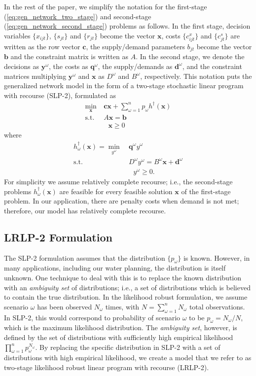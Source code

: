 \documentclass[12pt]{amsart}
\newcommand{\x}{\mathbf{x}}
\newcommand{\y}{\mathbf{y}}
\renewcommand{\c}{\mathbf{c}}
\newcommand{\q}{\mathbf{q}}
\renewcommand{\b}{\mathbf{b}}
\renewcommand{\d}{\mathbf{d}}
\newcommand{\st}{\mbox{s.t.}}
\begin{document}
In the rest of the paper, we simplify the notation for the first-stage (\ref{eq:gen_network_two_stage}) and second-stage (\ref{eq:gen_network_second_stage}) problems as follows.
In the first stage, decision variables $\{x_{ijt}\}$, $\{s_{jt}\}$ and $\{r_{jt}\}$ become the vector $\x$, costs $\{c_{ijt}^x\}$ and $\{c_{jt}^s\}$ are written as the row vector $\c$, the supply/demand parameters $b_{jt}$ become the vector $\b$ and the constraint matrix is written as $A$.
In the second stage, we denote the decisions as $\y^\omega$, the costs as $\q^\omega$, the supply/demands as $\d^\omega$, and the constraint matrices multiplying $\y^\omega$ and $\x$ as $D^\omega$ and $B^\omega$, respectively.
This notation puts the generalized network model in the form of a two-stage stochastic linear program with recourse (SLP-2), formulated as
\begin{align}
	\min_\x \ & \c\x + \sum_{\omega=1}^n p_\omega h^\dagger(\x) \label{eq:slp_first_stage} \\
	\st \ & A\x = \b \nonumber  \\
	&\ \ \ \x \geq 0 \nonumber
\end{align}
where
\begin{align}
	h^\dagger_\omega(\x) = \min_{y^\omega} \ & \q^\omega y^\omega \label{eq:slp_second_stage} \\
	\st \ & D^\omega y^\omega = B^\omega \x + \d^\omega \nonumber \\
	& \ \ \ y^\omega \geq 0. \nonumber
\end{align}
For simplicity we assume relatively complete recourse; i.e., the second-stage problems $h^\dagger_\omega(\x)$ are feasible for every feasible solution $\x$ of the first-stage problem. In our application, there are penalty costs when demand is not met; therefore, our model has relatively complete recourse. 


\subsection{LRLP-2 Formulation}
\label{sec:lrlp2}

The SLP-2 formulation assumes that the distribution $\{p_\omega\}$ is known.
However, in many applications, including our water planning, the distribution is itself unknown.
One technique to deal with this is to replace the known distribution with an {\it ambiguity set} of distributions; i.e., a set of distributions which is believed to contain the true distribution.
In the likelihood robust formulation, we assume scenario $\omega$ has been observed $N_\omega$ times, with $N = \sum_{\omega=1}^n N_\omega$ total observations. 
In SLP-2, this would correspond to probability of scenario $\omega$ to be $p_\omega = N_\omega / N$, which is the maximum likelihood distribution. 
The {\it ambiguity set}, however, is defined by the set of distributions with sufficiently high empirical likelihood $\prod_{\omega=1}^n p_\omega^{N_\omega}$. 
By replacing the specific distribution in SLP-2 with a set of distributions with  high empirical likelihood, we create a model that we refer to as two-stage likelihood robust linear program with recourse (LRLP-2).
\end{document}
